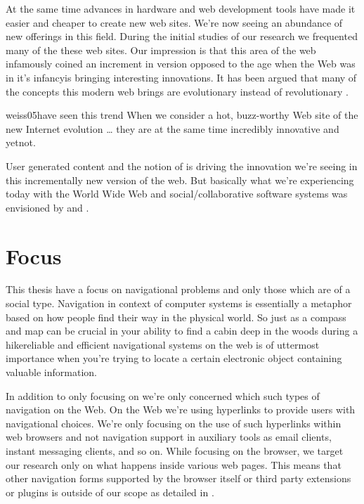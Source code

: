 At the same time advances in hardware and web development tools have made it
easier and cheaper to create new web sites. We're now seeing an
abundance of new offerings in this field.
During the initial studies of our research we frequented
many of the these web sites. Our impression is that
this area of the web infamously coined \dash{}an
increment in version opposed to the age when the Web was in it's
infancy\dash{}is bringing interesting innovations.
It has been argued that many of the concepts this modern web brings are
evolutionary instead of revolutionary \citep[p.~45]{yakovlev07}.
\begin{fullquote}[p.~18]{weiss05}{have seen this trend}
  When we consider a hot, buzz-worthy Web site of the new Internet evolution
  \ldots
  they are at the same time incredibly innovative and yet\dash{}not.
\end{fullquote}

User generated content and the notion of %
is driving the innovation we're seeing in this incrementally new version of
the web. But basically what we're experiencing today with the World Wide Web
and social/collaborative software systems was envisioned by \citet{bush45}
and \citet{licklider68}.

\section{Focus}

This thesis have a focus on navigational problems and only those
which are of a social type.%
Navigation in context of computer systems is
essentially a metaphor based on how people find their way in the physical
world. So just as a compass and map can be crucial in your ability to find a
cabin deep in the woods during a hike\dash{}reliable and efficient
navigational systems on the web is of uttermost importance when you're trying
to locate a certain electronic object containing valuable information.

\placeBlogSideTable

In addition to only focusing on  we're only concerned
which such types of navigation on the Web.
On the Web we're using hyperlinks \citep[p.~90]{nelson65} to provide users
with navigational choices. We're only focusing on the use of such hyperlinks
within web browsers and not navigation support in auxiliary tools as email
clients, instant messaging clients, and so on. While focusing on the browser,
we target our research only on what happens inside various web pages. This
means that other navigation forms supported by the browser itself or third
party extensions or plugins is outside of our scope as detailed in
.


